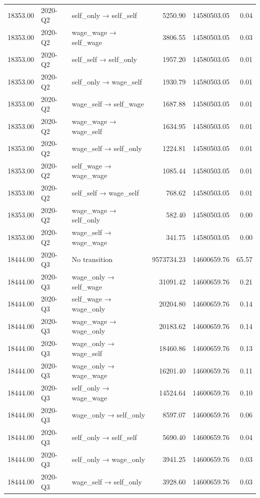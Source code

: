 \begin{table}[ht]
{\begin{tabular}{rllrrr}
  18353.00 & 2020-Q2 & self\_only → self\_self & 5250.90 & 14580503.05 & 0.04 \\ 
  18353.00 & 2020-Q2 & wage\_wage → self\_wage & 3806.55 & 14580503.05 & 0.03 \\ 
  18353.00 & 2020-Q2 & self\_self → self\_only & 1957.20 & 14580503.05 & 0.01 \\ 
  18353.00 & 2020-Q2 & self\_only → wage\_self & 1930.79 & 14580503.05 & 0.01 \\ 
  18353.00 & 2020-Q2 & wage\_self → self\_wage & 1687.88 & 14580503.05 & 0.01 \\ 
  18353.00 & 2020-Q2 & wage\_wage → wage\_self & 1634.95 & 14580503.05 & 0.01 \\ 
  18353.00 & 2020-Q2 & wage\_self → self\_only & 1224.81 & 14580503.05 & 0.01 \\ 
  18353.00 & 2020-Q2 & self\_wage → wage\_wage & 1085.44 & 14580503.05 & 0.01 \\ 
  18353.00 & 2020-Q2 & self\_self → wage\_self & 768.62 & 14580503.05 & 0.01 \\ 
  18353.00 & 2020-Q2 & wage\_wage → self\_only & 582.40 & 14580503.05 & 0.00 \\ 
  18353.00 & 2020-Q2 & wage\_self → wage\_wage & 341.75 & 14580503.05 & 0.00 \\ 
  18444.00 & 2020-Q3 & No transition & 9573734.23 & 14600659.76 & 65.57 \\ 
  18444.00 & 2020-Q3 & wage\_only → self\_wage & 31091.42 & 14600659.76 & 0.21 \\ 
  18444.00 & 2020-Q3 & self\_wage → wage\_only & 20204.80 & 14600659.76 & 0.14 \\ 
  18444.00 & 2020-Q3 & wage\_wage → wage\_only & 20183.62 & 14600659.76 & 0.14 \\ 
  18444.00 & 2020-Q3 & wage\_only → wage\_self & 18460.86 & 14600659.76 & 0.13 \\ 
  18444.00 & 2020-Q3 & wage\_only → wage\_wage & 16201.40 & 14600659.76 & 0.11 \\ 
  18444.00 & 2020-Q3 & self\_only → wage\_wage & 14524.64 & 14600659.76 & 0.10 \\ 
  18444.00 & 2020-Q3 & wage\_only → self\_only & 8597.07 & 14600659.76 & 0.06 \\ 
  18444.00 & 2020-Q3 & self\_only → self\_self & 5690.40 & 14600659.76 & 0.04 \\ 
  18444.00 & 2020-Q3 & self\_only → wage\_only & 3941.25 & 14600659.76 & 0.03 \\ 
  18444.00 & 2020-Q3 & wage\_self → self\_only & 3928.60 & 14600659.76 & 0.03 \\ 

\end{tabular}}
\end{table}
